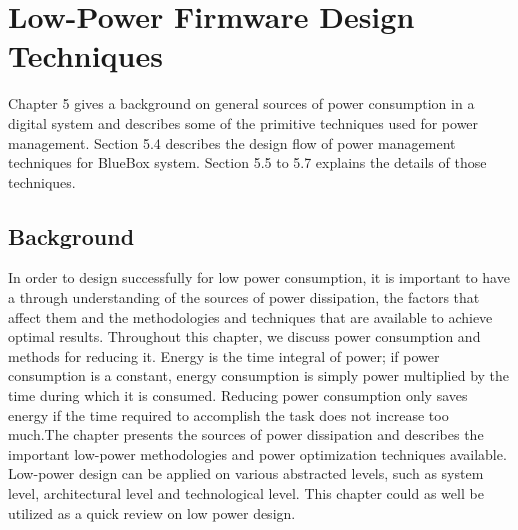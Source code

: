 \chapter{Low-Power Firmware Design Techniques}

Chapter 5 gives a background on general sources of power consumption in a digital system and describes some of the primitive techniques used for power management. Section 5.4 describes the design flow of power management techniques for BlueBox system. Section 5.5 to 5.7 explains the details of those techniques.  
\section{Background} In order to design successfully for low power consumption, it is important to have a through understanding of the sources  of power dissipation, the factors that affect them and the methodologies and techniques that are available to achieve optimal results.  
Throughout this chapter, we discuss power consumption and methods for reducing it. Energy is the time integral of power; if power consumption is a constant, energy 
consumption is simply power multiplied by the time during which it is consumed. 
Reducing power consumption only saves energy if the time required to accomplish the 
task does not increase too much.The chapter presents the sources of power dissipation and describes the important low-power methodologies and power optimization techniques available. Low-power design can be applied on various abstracted levels, such as system level, architectural level and technological level. This chapter could as well be utilized as a quick review on low power design. 

